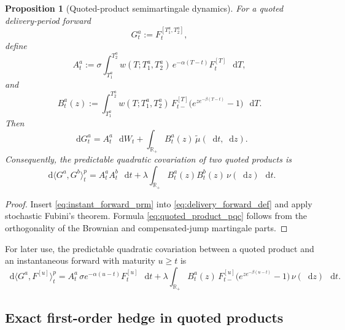 \documentclass[10pt,a4paper,reqno]{amsart}
\newcommand{\<}{\langle}
\renewcommand{\>}{\rangle}
\newtheorem{proposition}[theorem]{Proposition}
\theoremstyle{example}
\newcommand*\D{\mathop{}\!\mathrm{d}}
\begin{document}
\begin{proposition}[Quoted-product semimartingale dynamics]
\label{prop:quoted_product_dynamics}
For a quoted delivery-period forward
\[
G_t^a := F_t^{[T_1^a,T_2^a]},
\]
define
\begin{equation}
\label{eq:Aa_def}
A_t^a
:=
\sigma
\int_{T_1^a}^{T_2^a}
w(T;T_1^a,T_2^a)\,
e^{-\alpha(T-t)}F_t^{[T]}\,\D T,
\end{equation}
and
\begin{equation}
\label{eq:Ba_def}
B_t^a(z)
:=
\int_{T_1^a}^{T_2^a}
w(T;T_1^a,T_2^a)\,
F_{t-}^{[T]}
\Big(
e^{z e^{-\beta(T-t)}}-1
\Big)\,\D T.
\end{equation}
Then
\begin{equation}
\label{eq:quoted_product_semimart}
\D G_t^a
=
A_t^a\,\D W_t
+
\int_{\mathbb{R}_+}
B_t^a(z)\,\widetilde{\mu}(\D t,\D z).
\end{equation}
Consequently, the predictable quadratic covariation of two quoted products is
\begin{equation}
\label{eq:quoted_product_pqc}
\D\langle G^a,G^b\rangle_t^{p}
=
A_t^aA_t^b\,\D t
+
\lambda
\int_{\mathbb{R}_+}
B_t^a(z)B_t^b(z)\,\nu(\D z)\,\D t.
\end{equation}
\end{proposition}

\begin{proof}
Insert \eqref{eq:instant_forward_prm} into \eqref{eq:delivery_forward_def} and apply stochastic Fubini's
theorem. Formula \eqref{eq:quoted_product_pqc} follows from the orthogonality of the Brownian and
compensated-jump martingale parts.
\end{proof}

For later use, the predictable quadratic covariation between a quoted product and an instantaneous forward
with maturity $u \ge t$ is
\begin{equation}
\label{eq:cross_pqc_product_inst}
\D\langle G^a,F^{[u]}\rangle_t^{p}
=
A_t^a\,
\sigma e^{-\alpha(u-t)}F_t^{[u]}\,\D t
+
\lambda
\int_{\mathbb{R}_+}
B_t^a(z)\,
F_{t-}^{[u]}
\Big(
e^{z e^{-\beta(u-t)}}-1
\Big)\,
\nu(\D z)\,\D t.
\end{equation}

\subsection{Exact first-order hedge in quoted products}
\end{document}
